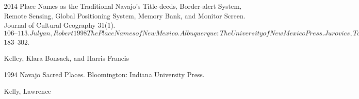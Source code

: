 2014  Place Names as the Traditional Navajo’s Title-deeds, Border-alert System, Remote Sensing, Global Positioning System, Memory Bank, and Monitor Screen.  Journal of Cultural Geography 31(1). $106–113.  

Julyan, Robert

1998  The Place Names of New Mexico.  Albuquerque:  The University of New Mexico Press.

Jurovics, Toby, Carol M. Johnson, Glen Willumson, and William F. Stapp

2010  Framing the West: The Survey Photographs of Timothy H. O’Sullivan.  Washington:  Library of Congress and Smithsonian American Art Museum/New Haven:  Yale University Press.

Kari, James

1989  Some Principles of Alaskan Toponymic Knowledge.  \textit{In} General and Amerindian Ethnolinguistics: In Remembrance of Stanley Newman.  Mary Ritchie Key and Henry M. Hoenigswald, eds.  Pp. 129–151.  Berlin:  Mouton de Gruyter.

2010  The Concept of Geolinguistic Conservatism in Na-Dene Prehistory.  \textit{In} The Dene-Yeniseian Connection.  James Kari and Ben A. Potter, eds.  Pp. 194–122.  Anthropological Papers of the University of Alaska, N.S. 5(1–2).  Fairbanks, AK:  Department of Anthropology and Alaska Native Language Center.

2011  A Case Study in Ahtna Athabascan Geographic Knowledge.  \textit{In} Landscape in Language: Transdisciplinary Perspectives.  David M. Mark, Andrew G. Turk, Niclas Burenhult and David Stea, eds.  Pp. 239–260.  Culture and Language Use: Studies in Anthropological Linguistics, 4.  Gunter Senft, ed.  Philadelphia:  John Benjamins Publishing Company.

–––––– and Ben A. Potter (eds.)  

2010  The Dene-Yeniseian Connection.  Anthropological Papers of the University of Alaska, N.S. 5(1–2).  Fairbanks, AK:  Department of Anthropology and Alaska Native Language Center.

Kearns, Robin A., and Lawrence D. Berg

2002  Proclaiming Place: Towards a Geography of Place Name Pronunciation.  Social \& Cultural Geography 3(3). $183–302.

Kelley, Klara Bonsack, and Harris Francis

1994  Navajo Sacred Places.  Bloomington:  Indiana University Press.

Kelly, Lawrence

